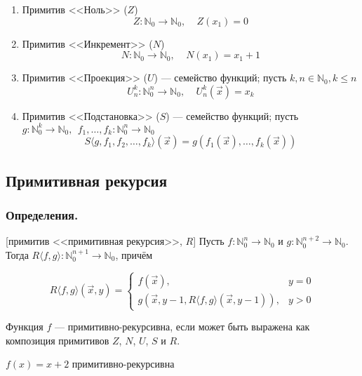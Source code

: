 \documentclass[10pt,a4paper,oneside]{article}
\begin{document}
\begin{enumerate}
\item Примитив <<Ноль>> ($Z$) \vspace{-0.3cm}
$$Z: \mathbb{N}_0\to\mathbb{N}_0,\ \ \ \ \ Z(x_1) = 0$$\vspace{-0.5cm}
\item Примитив <<Инкремент>> ($N$) \vspace{-0.3cm}
$$N: \mathbb{N}_0\to\mathbb{N}_0,\ \ \ \ \ N(x_1) = x_1+1$$\vspace{-0.5cm}
\item Примитив <<Проекция>> ($U$) — семейство функций; пусть $k,n \in \mathbb{N}_0, k \le n$\vspace{-0.2cm}
$$U^k_n: \mathbb{N}^n_0 \to \mathbb{N}_0,\ \ \ \ \ U^k_n(\overrightarrow{x}) = x_k$$\vspace{-0.5cm}
\item Примитив <<Подстановка>> ($S$) --- семейство функций; пусть $g: \mathbb{N}^k_0 \to \mathbb{N}_0,\ \ f_1,\dots,f_k: \mathbb{N}^n_0 \to \mathbb{N}_0$
$$S\langle g,f_1,f_2,\dots,f_k \rangle (\overrightarrow{x}) = g(f_1(\overrightarrow{x}),\dots,f_k(\overrightarrow{x}))$$
\end{enumerate}

\subsection{Примитивная рекурсия}
\subsubsection{Определения.}
 [примитив <<примитивная рекурсия>>, $R$]
Пусть $f: \mathbb{N}^n_0\to\mathbb{N}_0$ и $g: \mathbb{N}^{n+2}_0 \to\mathbb{N}_0$.
Тогда $R\langle f,g\rangle: \mathbb{N}^{n+1}_0\to\mathbb{N}_0$, причём

$$R\langle f,g\rangle(\overrightarrow{x},y)=
 \left\{\begin{array}{ll} 
  f(\overrightarrow{x}), &y=0\\
  g(\overrightarrow{x},y-1,R\langle f,g\rangle (\overrightarrow{x},y-1)), &y > 0
\end{array}\right.$$

 Функция $f$ --- примитивно-рекурсивна, если может быть
выражена как композиция примитивов $Z$, $N$, $U$, $S$ и $R$.

$f(x) = x+2$ примитивно-рекурсивна
\end{document}

